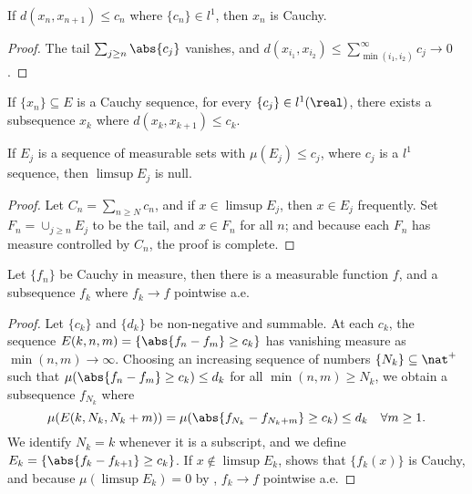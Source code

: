 \documentclass[../../main.tex]{subfiles}
\begin{document}
\begin{note}
        \begin{lemma}\label{lem: cauchy sequences from l1 bound}
        If $d(x_n, x_{n+1})\leq c_n$ where $\{c_n\}\in l^1$, then $x_n$ is Cauchy.    
        \end{lemma}
        \begin{proof}
            The tail $\sum_{j\geq n}\abs{c_j}$ vanishes, and $d(x_{i_1}, x_{i_2})\leq \sum_{\min(i_1,i_2)}^\infty c_j\to 0$.
        \end{proof}
        \begin{lemma}\label{lem: l1 bounds from Cauchy sequence}
            If $\{x_n\}\subseteq E$ is a Cauchy sequence, for every $\{c_j\}\in l^1(\real)$, there exists a subsequence $x_k$ where $d(x_{k}, x_{k+1})\leq c_k$.
        \end{lemma}
        \begin{corollary}\label{lem: l1 bounded limsup is null}
            If $E_j$ is a sequence of measurable sets with $\mu(E_j)\leq c_j$, where $c_j$ is a $l^1$ sequence, then $\limsup E_j$ is null.
        \end{corollary}
        \begin{proof}
            Let $C_n = \sum_{n\geq N}c_n$, and if $x\in \limsup E_j$, then $x\in E_j$ frequently. Set $F_n = \cup_{j\geq n} E_j$ to be the tail, and $x\in F_n$ for all $n$; and because each $F_n$ has measure controlled by $C_n$, the proof is complete.
        \end{proof}
\end{note}
\begin{wts}
    Let $\{f_n\}$ be Cauchy in measure, then there is a measurable function $f$, and a subsequence $f_k$ where $f_k\to f$ pointwise a.e.
\end{wts}
\begin{proof}
    Let $\{c_k\}$ and $\{d_k\}$ be non-negative and summable. At each $c_k$, the sequence $E(k,n,m) = \{\abs{f_n-f_m}\geq c_k\}$ has vanishing measure as $\min(n,m)\to\infty$. Choosing an increasing sequence of numbers $\{N_k\}\subseteq\nat^+$ such that $\mu(\abs{f_n - f_m}\geq c_k)\leq d_k$ for all $\min(n,m)\geq N_k$, we obtain a subsequence $f_{N_k}$ where
    \[
        \mu(E(k,N_k,N_k + m))=\mu(\abs{f_{N_k} - f_{{N_k}+m}}\geq c_k)\leq d_k\quad\forall m\geq 1.
    \]
    We identify $N_k = k$ whenever it is a subscript, and we define $E_k = \{\abs{f_{k} - f_{k+1}}\geq c_k\}$. If $x\notin \limsup E_k$,  shows that $\{f_k(x)\}$ is Cauchy, and because $\mu(\limsup E_k)=0$ by , $f_k\to f$ pointwise a.e.
\end{proof}
\end{document}
